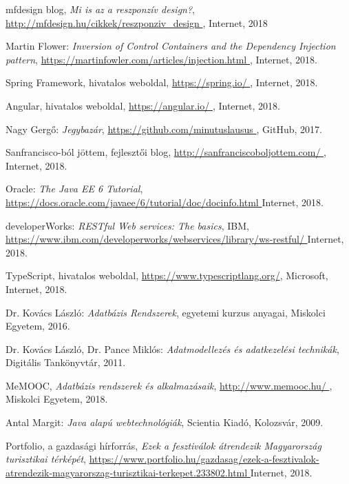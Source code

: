 
\begin{thebibliography}{x}

mfdesign blog, \emph{Mi is az a reszponzív design?}, \url{ http://mfdesign.hu/cikkek/reszponziv\_design }, Internet, 2018

Martin Flower: \emph{Inversion of Control Containers and the Dependency Injection pattern},
\url{ https://martinfowler.com/articles/injection.html }, Internet, 2018.

Spring Framework, hivatalos weboldal,
\url{ https://spring.io/ }, Internet, 2018.

Angular, hivatalos weboldal,
\url{ https://angular.io/ }, Internet, 2018.

Nagy Gergő: \emph{Jegybazár},
\url{ https://github.com/minutuslausus }, GitHub, 2017.

Sanfrancisco-ból jöttem, fejlesztői blog,
\url{ http://sanfranciscoboljottem.com/ },
Internet, 2018.

Oracle: 
\emph{The Java EE 6 Tutorial},
\url{ https://docs.oracle.com/javaee/6/tutorial/doc/docinfo.html }
Internet, 2018.

developerWorks: \emph{RESTful Web services: The basics}, IBM,
\url{ https://www.ibm.com/developerworks/webservices/library/ws-restful/ }
Internet, 2018.


TypeScript, hivatalos weboldal,
\url{https://www.typescriptlang.org/}, Microsoft,
Internet, 2018.

Dr. Kovács László: \emph{Adatbázis Rendszerek}, egyetemi kurzus anyagai, Miskolci Egyetem, 2016.

Dr. Kovács László, Dr. Pance Miklós: \emph{Adatmodellezés és adatkezelési technikák}, Digitális Tankönyvtár, 2011.

MeMOOC, \emph{Adatbázis rendszerek és alkalmazásaik}, \url{ http://www.memooc.hu/ },
Miskolci Egyetem, 2018.

Antal Margit: \emph{Java alapú webtechnológiák}, Scientia Kiadó, Kolozsvár, 2009.

Portfolio, a gazdasági hírforrás, \emph{Ezek a fesztiválok átrendezik Magyarország turisztikai térképét},
\url{ https://www.portfolio.hu/gazdasag/ezek-a-fesztivalok-atrendezik-magyarorszag-turisztikai-terkepet.233802.html }
Internet, 2018.


\end{thebibliography}
